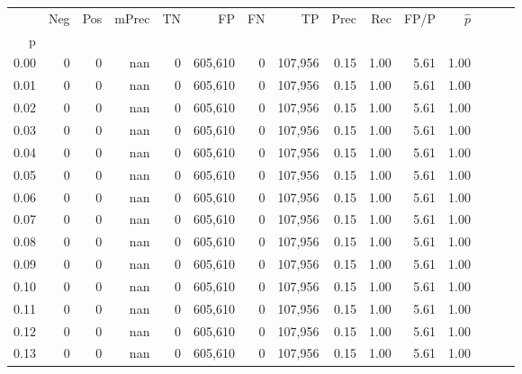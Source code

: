 \begin{tabular}{rrrrrrrrrrrrrrr}
\toprule
{} &      Neg &     Pos & mPrec &       TN &       FP &       FN &       TP &  Prec &   Rec &  FP/P & $\hat{p}$ \\
p    &          &         &       &          &          &          &          &       &       &       &           \\
\midrule
0.00 &        0 &       0 &   nan &        0 &  605,610 &        0 &  107,956 &  0.15 &  1.00 &  5.61 &      1.00 \\
0.01 &        0 &       0 &   nan &        0 &  605,610 &        0 &  107,956 &  0.15 &  1.00 &  5.61 &      1.00 \\
0.02 &        0 &       0 &   nan &        0 &  605,610 &        0 &  107,956 &  0.15 &  1.00 &  5.61 &      1.00 \\
0.03 &        0 &       0 &   nan &        0 &  605,610 &        0 &  107,956 &  0.15 &  1.00 &  5.61 &      1.00 \\
0.04 &        0 &       0 &   nan &        0 &  605,610 &        0 &  107,956 &  0.15 &  1.00 &  5.61 &      1.00 \\
0.05 &        0 &       0 &   nan &        0 &  605,610 &        0 &  107,956 &  0.15 &  1.00 &  5.61 &      1.00 \\
0.06 &        0 &       0 &   nan &        0 &  605,610 &        0 &  107,956 &  0.15 &  1.00 &  5.61 &      1.00 \\
0.07 &        0 &       0 &   nan &        0 &  605,610 &        0 &  107,956 &  0.15 &  1.00 &  5.61 &      1.00 \\
0.08 &        0 &       0 &   nan &        0 &  605,610 &        0 &  107,956 &  0.15 &  1.00 &  5.61 &      1.00 \\
0.09 &        0 &       0 &   nan &        0 &  605,610 &        0 &  107,956 &  0.15 &  1.00 &  5.61 &      1.00 \\
0.10 &        0 &       0 &   nan &        0 &  605,610 &        0 &  107,956 &  0.15 &  1.00 &  5.61 &      1.00 \\
0.11 &        0 &       0 &   nan &        0 &  605,610 &        0 &  107,956 &  0.15 &  1.00 &  5.61 &      1.00 \\
0.12 &        0 &       0 &   nan &        0 &  605,610 &        0 &  107,956 &  0.15 &  1.00 &  5.61 &      1.00 \\
0.13 &        0 &       0 &   nan &        0 &  605,610 &        0 &  107,956 &  0.15 &  1.00 &  5.61 &      1.00 \\

\end{tabular}
